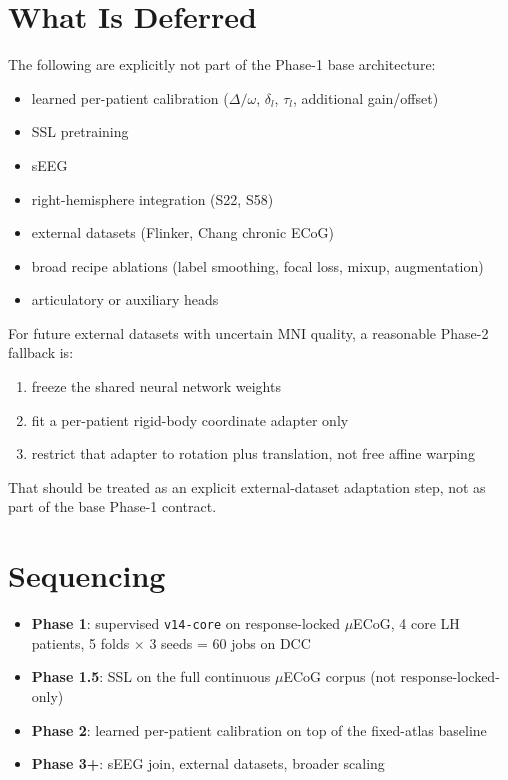 \documentclass[11pt,letterpaper]{article}
\begin{document}
\section{What Is Deferred}

The following are explicitly not part of the Phase-1 base architecture:
\begin{itemize}[leftmargin=2em, itemsep=0.2em]
\item learned per-patient calibration ($\Delta/\omega$, $\delta_l$, $\tau_l$, additional gain/offset)
\item SSL pretraining
\item sEEG
\item right-hemisphere integration (S22, S58)
\item external datasets (Flinker, Chang chronic ECoG)
\item broad recipe ablations (label smoothing, focal loss, mixup, augmentation)
\item articulatory or auxiliary heads
\end{itemize}

For future external datasets with uncertain MNI quality, a reasonable Phase-2 fallback is:
\begin{enumerate}[leftmargin=2em, itemsep=0.2em]
\item freeze the shared neural network weights
\item fit a per-patient rigid-body coordinate adapter only
\item restrict that adapter to rotation plus translation, not free affine warping
\end{enumerate}

That should be treated as an explicit external-dataset adaptation step, not as part of the base Phase-1 contract.


\section{Sequencing}

\begin{itemize}[leftmargin=2em, itemsep=0.2em]
\item \textbf{Phase 1}: supervised \texttt{v14-core} on response-locked $\mu$ECoG, 4 core LH patients, 5 folds $\times$ 3 seeds = 60 jobs on DCC
\item \textbf{Phase 1.5}: SSL on the full continuous $\mu$ECoG corpus (not response-locked-only)
\item \textbf{Phase 2}: learned per-patient calibration on top of the fixed-atlas baseline
\item \textbf{Phase 3+}: sEEG join, external datasets, broader scaling
\end{itemize}
\end{document}
